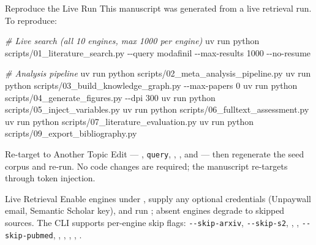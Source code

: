 \documentclass[
  ignorenonframetext,
]{beamer}
\newenvironment{Shaded}{}{}
\newcommand{\AttributeTok}[1]{\textcolor[rgb]{0.49,0.56,0.16}{#1}}
\newcommand{\CommentTok}[1]{\textcolor[rgb]{0.38,0.63,0.69}{\textit{#1}}}
\newcommand{\ExtensionTok}[1]{#1}
\newcommand{\NormalTok}[1]{#1}
\begin{document}
\begin{frame}{Reproduce the Live Run}
\protect{}\label{reproduce-the-live-run}
This manuscript was generated from a live retrieval run. To reproduce:

\begin{Shaded}
\begin{Highlighting}[]
\CommentTok{\# Live search (all 10 engines, max 1000 per engine)}
\ExtensionTok{uv}\NormalTok{ run python scripts/01\_literature\_search.py }\AttributeTok{{-}{-}query}\NormalTok{ modafinil }\AttributeTok{{-}{-}max{-}results}\NormalTok{ 1000 }\AttributeTok{{-}{-}no{-}resume}

\CommentTok{\# Analysis pipeline}
\ExtensionTok{uv}\NormalTok{ run python scripts/02\_meta\_analysis\_pipeline.py}
\ExtensionTok{uv}\NormalTok{ run python scripts/03\_build\_knowledge\_graph.py }\AttributeTok{{-}{-}max{-}papers}\NormalTok{ 0}
\ExtensionTok{uv}\NormalTok{ run python scripts/04\_generate\_figures.py }\AttributeTok{{-}{-}dpi}\NormalTok{ 300}
\ExtensionTok{uv}\NormalTok{ run python scripts/05\_inject\_variables.py}
\ExtensionTok{uv}\NormalTok{ run python scripts/06\_fulltext\_assessment.py}
\ExtensionTok{uv}\NormalTok{ run python scripts/07\_literature\_evaluation.py}
\ExtensionTok{uv}\NormalTok{ run python scripts/09\_export\_bibliography.py}
\end{Highlighting}
\end{Shaded}
\end{frame}

\begin{frame}{Re-target to Another Topic}
\protect{}\label{re-target-to-another-topic}
Edit  ---
, \texttt{query},
, , and
 --- then regenerate the seed corpus and
re-run. No code changes are required; the manuscript re-targets through
token injection.
\end{frame}

\begin{frame}{Live Retrieval}
\protect{}\label{live-retrieval}
Enable engines under , supply any
optional credentials (Unpaywall email, Semantic Scholar key), and run
; absent engines degrade to
skipped sources. The CLI supports per-engine skip flags:
\texttt{-\/-skip-arxiv}, \texttt{-\/-skip-s2},
, ,
\texttt{-\/-skip-pubmed}, ,
, ,
, .
\end{frame}
\end{document}
